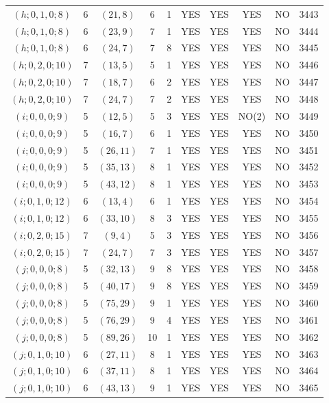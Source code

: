 \begin{longtable}{|c|c|c|c|c|c|c|c|c|c|}
$(h; 0, 1, 0; 8)$ & 6 & $(21, 8)$ & 6 & 1 & YES & YES & YES & NO & 3443\\
$(h; 0, 1, 0; 8)$ & 6 & $(23, 9)$ & 7 & 1 & YES & YES & YES & NO & 3444\\
$(h; 0, 1, 0; 8)$ & 6 & $(24, 7)$ & 7 & 8 & YES & YES & YES & NO & 3445\\
$(h; 0, 2, 0; 10)$ & 7 & $(13, 5)$ & 5 & 1 & YES & YES & YES & NO & 3446\\
$(h; 0, 2, 0; 10)$ & 7 & $(18, 7)$ & 6 & 2 & YES & YES & YES & NO & 3447\\
$(h; 0, 2, 0; 10)$ & 7 & $(24, 7)$ & 7 & 2 & YES & YES & YES & NO & 3448\\
$(i; 0, 0, 0; 9)$ & 5 & $(12, 5)$ & 5 & 3 & YES & YES & NO(2) & NO & 3449\\
$(i; 0, 0, 0; 9)$ & 5 & $(16, 7)$ & 6 & 1 & YES & YES & YES & NO & 3450\\
$(i; 0, 0, 0; 9)$ & 5 & $(26, 11)$ & 7 & 1 & YES & YES & YES & NO & 3451\\
$(i; 0, 0, 0; 9)$ & 5 & $(35, 13)$ & 8 & 1 & YES & YES & YES & NO & 3452\\
$(i; 0, 0, 0; 9)$ & 5 & $(43, 12)$ & 8 & 1 & YES & YES & YES & NO & 3453\\
$(i; 0, 1, 0; 12)$ & 6 & $(13, 4)$ & 6 & 1 & YES & YES & YES & NO & 3454\\
$(i; 0, 1, 0; 12)$ & 6 & $(33, 10)$ & 8 & 3 & YES & YES & YES & NO & 3455\\
$(i; 0, 2, 0; 15)$ & 7 & $(9, 4)$ & 5 & 3 & YES & YES & YES & NO & 3456\\
$(i; 0, 2, 0; 15)$ & 7 & $(24, 7)$ & 7 & 3 & YES & YES & YES & NO & 3457\\
$(j; 0, 0, 0; 8)$ & 5 & $(32, 13)$ & 9 & 8 & YES & YES & YES & NO & 3458\\
$(j; 0, 0, 0; 8)$ & 5 & $(40, 17)$ & 9 & 8 & YES & YES & YES & NO & 3459\\
$(j; 0, 0, 0; 8)$ & 5 & $(75, 29)$ & 9 & 1 & YES & YES & YES & NO & 3460\\
$(j; 0, 0, 0; 8)$ & 5 & $(76, 29)$ & 9 & 4 & YES & YES & YES & NO & 3461\\
$(j; 0, 0, 0; 8)$ & 5 & $(89, 26)$ & 10 & 1 & YES & YES & YES & NO & 3462\\
$(j; 0, 1, 0; 10)$ & 6 & $(27, 11)$ & 8 & 1 & YES & YES & YES & NO & 3463\\
$(j; 0, 1, 0; 10)$ & 6 & $(37, 11)$ & 8 & 1 & YES & YES & YES & NO & 3464\\
$(j; 0, 1, 0; 10)$ & 6 & $(43, 13)$ & 9 & 1 & YES & YES & YES & NO & 3465
\end{longtable}
